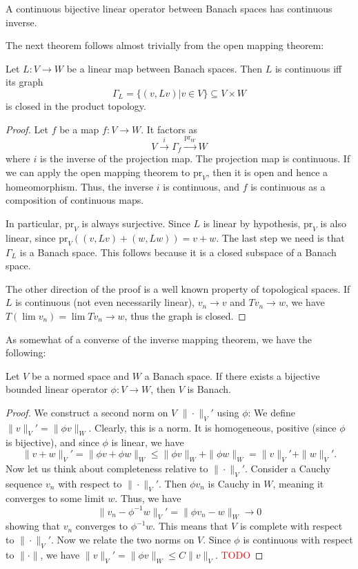 \documentclass[twoside,symmetric, openany, 12pt]{./tuftebook}
\theoremstyle{definition}
\theoremstyle{definition}
\theoremstyle{definition}
\begin{document}
\begin{Corollary}
	A continuous bijective linear operator between Banach spaces has continuous inverse.
\end{Corollary}

The next theorem follows almost trivially from the open mapping theorem:
\begin{Theorem}
	Let $L:V\to W$ be a linear map between Banach spaces. Then $L$ is continuous iff its graph
	\[\Gamma_L=\{(v, Lv)|v\in V\}\subseteq V\times W\]
	is closed in the product topology. 
\end{Theorem}
\begin{proof}
	Let $f$ be a map $f:V\to W$. It factors as
	\[V \xrightarrow{i} \Gamma_f \xrightarrow{\text{pr}_W} W\]
	where $i$ is the inverse of the projection map. The projection map is continuous. If we can apply the open mapping theorem to $\text{pr}_V$, then it is open and hence a homeomorphism. Thus, the inverse $i$ is continuous, and $f$ is continuous as a composition of continuous maps. 
	
	In particular, $\text{pr}_V$ is always surjective. Since $L$ is linear by hypothesis, $\text{pr}_V$ is also linear, since $\text{pr}_V((v, Lv) + (w, Lw)) = v + w$. The last step we need is that $\Gamma_L$ is a Banach space. This follows because it is a closed subspace of a Banach space.
	
	The other direction of the proof is a well known property of topological spaces. If $L$ is continuous (not even necessarily linear), $v_n \to v$ and $Tv_n \to w$, we have $T (\lim v_n)= \lim Tv_n \to w$, thus the graph is closed. 
\end{proof}
As somewhat of a converse of the inverse mapping theorem, we have the following:
\begin{Theorem}
	Let $V$ be a normed space and $W$ a Banach space. If there exists a bijective bounded linear operator $\phi:V \to W$, then $V$ is Banach.
\end{Theorem}
\begin{proof}
	We construct a second norm on $V$ $\|\cdot \|_V'$ using $\phi$: We define $\|v\|_V'=\|\phi v\|_W$. Clearly, this is a norm. It is homogeneous, positive (since $\phi$ is bijective), and since $\phi$ is linear, we have
	\[\|v + w\|_V' = \|\phi v + \phi w\|_W \le \|\phi v\|_W + \|\phi w\|_W = \|v\|_V' + \|w\|_V'.\]
	Now let us think about completeness relative to $\|\cdot \|_V'$. Consider a Cauchy sequence $v_n$ with respect to $\|\cdot\|_V'$. Then $\phi v_n$ is Cauchy in $W$, meaning it converges to some limit $w$. Thus, we have
	\[\|v_n - \phi^{-1}w\|_V' = \|\phi v_n - w\|_W \to 0\]
	showing that $v_n$ converges to $\phi^{-1}w$. This means that $V$ is complete with respect to $\|\cdot\|_V'$. Now we relate the two norms on $V$. Since $\phi$ is continuous with respect to $\|\cdot\|$, we have $\|v\|_V' = \|\phi v\|_W \le  C\|v\|_V$. \textcolor{red}{TODO}
\end{proof}
\end{document}
